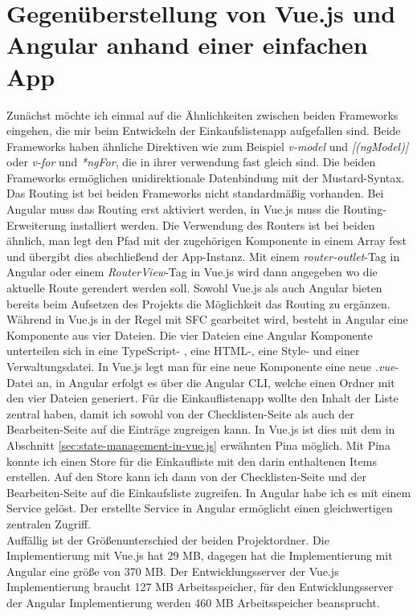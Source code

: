\section{Gegenüberstellung von Vue.js und Angular anhand einer einfachen App}
Zunächst möchte ich einmal auf die Ähnlichkeiten zwischen beiden Frameworks eingehen, die mir beim Entwickeln der Einkaufslistenapp aufgefallen sind.
Beide Frameworks haben ähnliche Direktiven wie zum Beispiel \emph{v-model} und \emph{[(ngModel)]} oder \emph{v-for} und \emph{*ngFor},
die in ihrer verwendung fast gleich sind.
Die beiden Frameworks ermöglichen unidirektionale Datenbindung mit der Mustard-Syntax.
Das Routing ist bei beiden Frameworks nicht standardmäßig vorhanden.
Bei Angular muss das Routing erst aktiviert werden, in Vue.js muss die Routing-Erweiterung installiert werden.
Die Verwendung des Routers ist bei beiden ähnlich, man legt den Pfad mit der zugehörigen Komponente in einem Array fest
und übergibt dies abschließend der App-Instanz.
Mit einem \emph{router-outlet}-Tag in Angular oder einem \emph{RouterView}-Tag in Vue.js wird dann angegeben wo die aktuelle Route gerendert werden soll.
Sowohl Vue.js als auch Angular bieten bereits beim Aufsetzen des Projekts die Möglichkeit das Routing zu ergänzen.
Während in Vue.js in der Regel mit SFC gearbeitet wird, besteht in Angular eine Komponente aus vier Dateien.
Die vier Dateien eine Angular Komponente unterteilen sich in eine TypeScript- , eine HTML-, eine Style- und einer Verwaltungsdatei.
In Vue.js legt man für eine neue Komponente eine neue \emph{.vue}-Datei an,
in Angular erfolgt es über die Angular CLI, welche einen Ordner mit den vier Dateien generiert.
Für die Einkauflistenapp wollte den Inhalt der Liste zentral haben, damit ich sowohl von der Checklisten-Seite als auch der Bearbeiten-Seite
auf die Einträge zugreigen kann.
In Vue.js ist dies mit dem in Abschnitt \ref{sec:state-management-in-vue.js} erwähnten Pina möglich.
Mit Pina konnte ich einen Store für die Einkaufliste mit den darin enthaltenen Items erstellen.
Auf den Store kann ich dann von der Checklisten-Seite und der Bearbeiten-Seite auf die Einkaufsliste zugreifen.
In Angular habe ich es mit einem Service gelöst.
Der erstellte Service in Angular ermöglicht einen gleichwertigen zentralen Zugriff.
\\
Auffällig ist der Größenunterschied der beiden Projektordner.
Die Implementierung mit Vue.js hat 29 MB, dagegen hat die Implementierung mit Angular eine größe von 370 MB.
Der Entwicklungsserver der Vue.js Implementierung braucht 127 MB Arbeitsspeicher, für den Entwicklungsserver der Angular Implementierung
werden 460 MB Arbeitsspeicher beansprucht.




